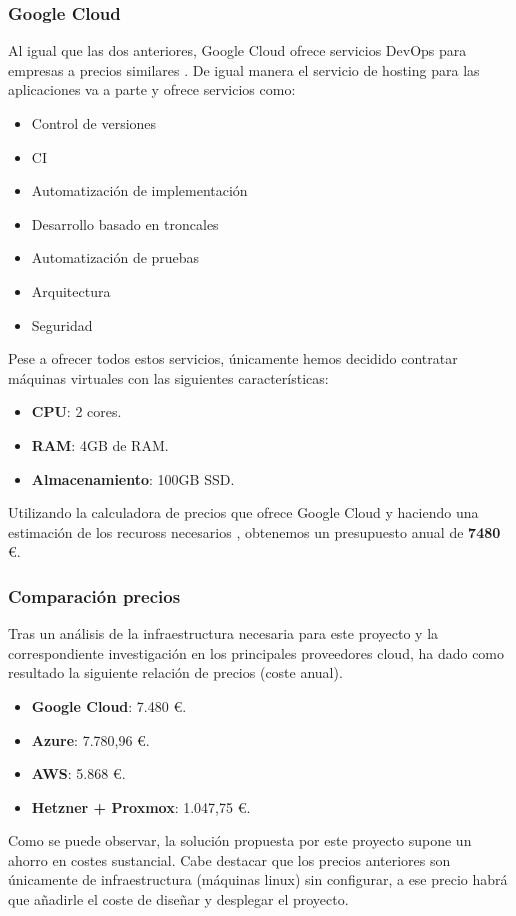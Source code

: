 		\subsubsection{Google Cloud}
			\begin{text}
				Al igual que las dos anteriores, Google Cloud ofrece servicios DevOps para empresas a precios similares \cite{GoogleCloud:online}. De igual manera el servicio de hosting para las aplicaciones va a parte y ofrece servicios como:
				\begin{itemize}
					\item Control de versiones
					\item CI
					\item Automatización de implementación
					\item Desarrollo basado en troncales
					\item Automatización de pruebas
					\item Arquitectura
					\item Seguridad
				\end{itemize}
			
			Pese a ofrecer todos estos servicios, únicamente hemos decidido contratar máquinas virtuales con las siguientes características:
			
			\begin{itemize}
				\item \textbf{CPU}: 2 cores.
				\item \textbf{RAM}: 4GB de RAM.
				\item \textbf{Almacenamiento}: 100GB SSD.
			\end{itemize}
			
			Utilizando la calculadora de precios que ofrece Google Cloud \cite{googlecloudcalculadora:online} y haciendo una estimación de los recuross necesarios , obtenemos un presupuesto anual de \textbf{7480} \euro.
			\end{text}
		
		\clearpage
		\subsubsection{Comparación precios}
			\begin{text}
				Tras un análisis de la infraestructura necesaria para este proyecto y la correspondiente investigación en los principales proveedores cloud, ha dado como resultado la siguiente relación de precios (coste anual).
				\begin{itemize}
					\item \textbf{Google Cloud}: 7.480 \euro.
					\item \textbf{Azure}: 7.780,96 \euro.
					\item \textbf{AWS}: 5.868 \euro.
					\item \textbf{Hetzner + Proxmox}: 1.047,75 \euro.
				\end{itemize}	
			Como se puede observar, la solución propuesta por este proyecto supone un ahorro en costes sustancial. Cabe destacar que los precios anteriores son únicamente de infraestructura (máquinas linux) sin configurar, a ese precio habrá que añadirle el coste de diseñar y desplegar el proyecto.
			\end{text}

